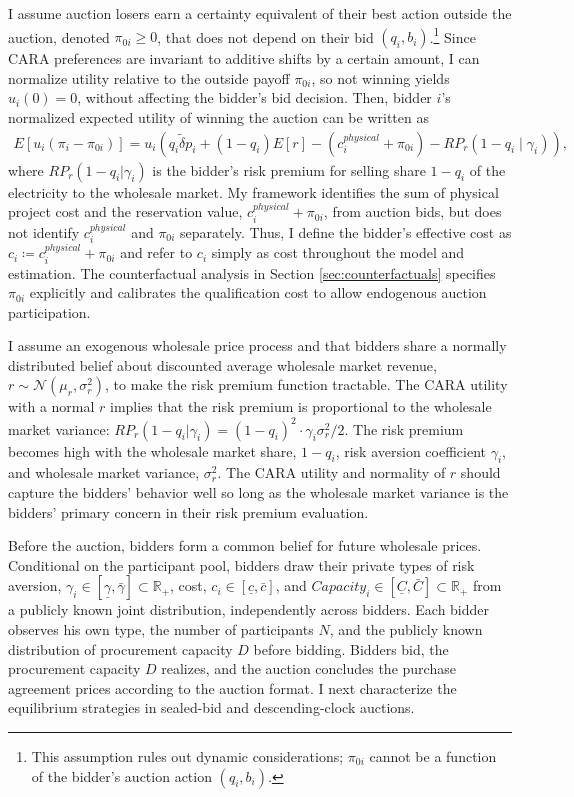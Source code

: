 \documentclass[12pt]{article}
\theoremstyle{definition} %
\begin{document}
I assume auction losers earn a certainty equivalent of their best action outside the auction, denoted $\pi_{0i}\geq0$, that does not depend on their bid $(q_i,b_i) $.\footnote{
This assumption rules out dynamic considerations; $\pi_{0i}$ cannot be a function of the bidder's auction action $(q_i,b_i) $.
}
Since CARA preferences are invariant to additive shifts by a certain amount, I can normalize utility relative to the outside payoff $\pi_{0i}$, so not winning yields $u_i(0)=0$, without affecting the bidder's bid decision. Then, bidder $i$'s normalized expected utility of winning the auction can be written as
\begin{align*}
E\!\left[u_i(\pi_i-\pi_{0i})\right]
= u_i\!\left(
q_i \tilde{\delta} p_i + (1-q_i)E[r] - (c_i^{physical}+\pi_{0i})
-RP_r(1-q_i\mid\gamma_i)
\right),
\end{align*}
where $RP_r(1-q_i|\gamma_i) $ is the bidder's risk premium for selling share $1 - q_i$ of the electricity to the wholesale market. My framework identifies the sum of physical project cost and the reservation value, $c_i^{physical} + \pi_{0i} $, from auction bids, but does not identify $c_i^{physical} $ and $\pi_{0i} $ separately. Thus, I define the bidder's effective cost as $c_i\coloneqq c_i^{physical}+\pi_{0i}$ and refer to $c_i$ simply as cost throughout the model and estimation. The counterfactual analysis in Section \ref{sec:counterfactuals} specifies \(\pi_{0i}\) explicitly and calibrates the qualification cost to allow endogenous auction participation.

I assume an exogenous wholesale price process and that bidders share a normally distributed belief about discounted average wholesale market revenue, $r \sim \mathcal{N}(\mu_r,\sigma_r^2)$, to make the risk premium function tractable. The CARA utility with a normal $r$ implies that the risk premium is proportional to the wholesale market variance: $RP_r(1-q_i|\gamma_i) = (1-q_i)^2 \cdot \gamma_i \sigma_r^2/2$. The risk premium becomes high with the wholesale market share, $1-q_i $, risk aversion coefficient $\gamma_i$, and wholesale market variance, $\sigma_r^2 $. The CARA utility and normality of $r$ should capture the bidders' behavior well so long as the wholesale market variance is the bidders' primary concern in their risk premium evaluation.

Before the auction, bidders form a common belief for future wholesale prices. Conditional on the participant pool, bidders draw their private types of risk aversion, $\gamma_i \in [\underline{\gamma},\bar{\gamma}] \subset \mathbb R_{+} $, cost, $c_i \in [\underline{c},\bar{c}]$, and $Capacity_i \in [\underline{C},\bar{C}] \subset \mathbb R_{+}$ from a publicly known joint distribution, independently across bidders. Each bidder observes his own type, the number of participants \(N\), and the publicly known distribution of procurement capacity \(D\) before bidding. Bidders bid, the procurement capacity $D$ realizes, and the auction concludes the purchase agreement prices according to the auction format. I next characterize the equilibrium strategies in sealed-bid and descending-clock auctions.
\end{document}
